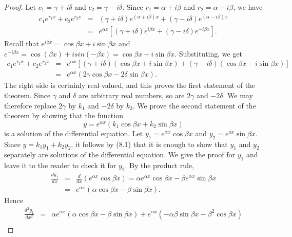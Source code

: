 \begin{proof}
Let $c_1 = \gamma + i\delta$ and $c_2 = \gamma - i\delta$. Since $r_1 = \alpha + i\beta$ and $r_2 = \alpha - i\beta$, we have
\begin{eqnarray*}
c_{1}e^{r_{1}x} + c_{2}e^{r_{2}x} &=& (\gamma + i\delta) e^{(\alpha + i\beta)x} + 
(\gamma - i \delta) e^{(\alpha - i\beta)x}\\
&=& e^{\alpha x}[(\gamma + i \delta) e^{i\beta x} + (\gamma - i\delta) e^{-i\beta x}].
\end{eqnarray*}
Recall that $e^{i\beta x} = \cos \beta x + i \sin \beta x$ and $e^{-i\beta x} = 
\cos(\beta x) + i sin(-\beta x) = \cos \beta x - i \sin \beta x$. Substituting, we get
\begin{eqnarray*}
c_{1}e^{r_{1}x} + c_{2}e^{r_{2}x} &=& e^{\alpha x} [(\gamma + i\delta)(\cos \beta x + i \sin \beta x) 
+ (\gamma - i\delta)(\cos \beta x - i \sin \beta x)]\\
&=& e^{\alpha x} (2\gamma \cos \beta x - 2\delta \sin \beta x).
\end{eqnarray*}
The right side is certainly real-valued, and this proves the first statement of the theorem.
Since $\gamma$ and $\delta$ are arbitrary real numbers, so are $2\gamma$ and $-2\delta$. We may therefore replace $2\gamma$ by $k_1$ and $-2\delta$ by $k_2$. We prove the second statement of the theorem by showing that the function
\begin{equation}
y = e^{\alpha x}(k_{1} \cos \beta x + k_{2} \sin \beta x)   
\label{eq6.8.3}
\end{equation}
is a solution of the differential equation. Let $y_1 = e^{\alpha x} \cos \beta x$ and 
$y_2 = e^{ax} \sin \beta x$. Since $y = k_{1}y_1 + k_{2}y_2$, it follows by (8.1) that it is enough to show that $y_1$ and $y_2$ separately are solutions of the differential equation. We give the proof for $y_1$ and leave it to the reader to check it for $y_2$.  By the product rule,
\begin{eqnarray*}
\frac{dy_1}{dx} &=& \frac{d}{dx} (e^{\alpha x}\cos \beta x) 
= \alpha e^{\alpha x} \cos \beta x - \beta e^{\alpha x} \sin \beta x \\
                        &=& e^{\alpha x}(\alpha \cos \beta x - \beta \sin \beta x).
\end{eqnarray*}
Hence 
\begin{eqnarray*}
\frac{d^{2}y_1}{dx^2} &=& \alpha e^{\alpha x}(\alpha \cos \beta x - \beta \sin \beta x) +  e^{\alpha x}(-\alpha \beta \sin \beta x - \beta^{2} \cos \beta x) \\

\end{eqnarray*}
\end{proof}
